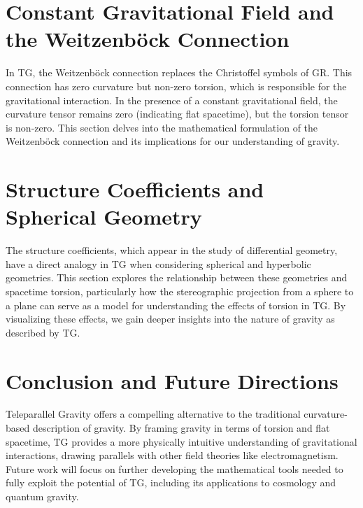 \documentclass[USletter,11pt]{article}
\begin{document}
\section{Constant Gravitational Field and the Weitzenböck Connection}
In TG, the Weitzenböck connection replaces the Christoffel symbols of GR. This connection has zero curvature but non-zero torsion, which is responsible for the gravitational interaction. In the presence of a constant gravitational field, the curvature tensor remains zero (indicating flat spacetime), but the torsion tensor is non-zero. This section delves into the mathematical formulation of the Weitzenböck connection and its implications for our understanding of gravity.

\section{Structure Coefficients and Spherical Geometry}
The structure coefficients, which appear in the study of differential geometry, have a direct analogy in TG when considering spherical and hyperbolic geometries. This section explores the relationship between these geometries and spacetime torsion, particularly how the stereographic projection from a sphere to a plane can serve as a model for understanding the effects of torsion in TG. By visualizing these effects, we gain deeper insights into the nature of gravity as described by TG.

\section{Conclusion and Future Directions}
Teleparallel Gravity offers a compelling alternative to the traditional curvature-based description of gravity. By framing gravity in terms of torsion and flat spacetime, TG provides a more physically intuitive understanding of gravitational interactions, drawing parallels with other field theories like electromagnetism. Future work will focus on further developing the mathematical tools needed to fully exploit the potential of TG, including its applications to cosmology and quantum gravity.
\end{document}

